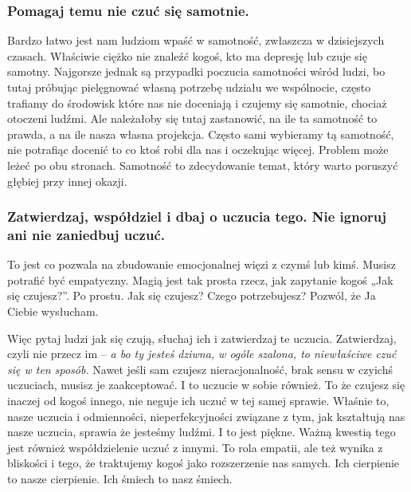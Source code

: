 \documentclass[../dotknieci-miloscia.tex]{subfiles}
\begin{document}
\subsubsection{Pomagaj temu nie czuć się samotnie.}
Bardzo łatwo jest nam ludziom wpaść w samotność, zwłaszcza w dzisiejszych czasach. 
Właściwie ciężko nie znaleźć kogoś, kto ma depresję lub czuje się samotny. 
Najgorsze jednak są przypadki poczucia samotności wśród ludzi, 
bo tutaj próbując pielęgnować własną potrzebę udziału we wspólnocie, 
często trafiamy do środowisk które nas nie doceniają 
i czujemy się samotnie, chociaż otoczeni ludźmi. 
Ale należałoby się tutaj zastanowić, na ile ta samotność to prawda, a na ile nasza własna projekcja.
Często sami wybieramy tą samotność, 
nie potrafiąc docenić to co ktoś robi dla nas i oczekując więcej. 
Problem może leżeć po obu stronach. 
Samotność to zdecydowanie temat, który warto poruszyć głębiej przy innej okazji. 

\subsubsection{Zatwierdzaj, współdziel i dbaj o uczucia tego. Nie ignoruj ani nie zaniedbuj uczuć.}
To jest co pozwala na zbudowanie emocjonalnej więzi z czymś lub kimś. 
Musisz potrafić być empatyczny. 
Magią jest tak prosta rzecz, jak zapytanie kogoś „Jak się czujesz?”. 
Po prostu. Jak się czujesz? 
Czego potrzebujesz? 
Pozwól, że Ja Ciebie wysłucham. 

Więc pytaj ludzi jak się czują, słuchaj ich i zatwierdzaj te uczucia. 
Zatwierdzaj, czyli nie przecz im 
-- \emph{a bo ty jesteś dziwna, w ogóle szalona, to niewłaściwe czuć się w ten sposób.} 
Nawet jeśli sam czujesz nieracjonalność, brak sensu w czyichś uczuciach, musisz je zaakceptować. 
I to uczucie w sobie również. 
To że czujesz się inaczej od kogoś innego, nie neguje ich uczuć w tej samej sprawie. 
Właśnie to, nasze uczucia i odmienności, nieperfekcyjności związane z tym, 
jak kształtują nas nasze uczucia, sprawia że jesteśmy ludźmi. 
I to jest piękne. 
Ważną kwestią tego jest również współdzielenie uczuć z innymi. 
To rola empatii, ale też wynika z bliskości i tego, 
że traktujemy kogoś jako rozszerzenie nas samych. 
Ich cierpienie to nasze cierpienie.
Ich śmiech to nasz śmiech.
\end{document}
